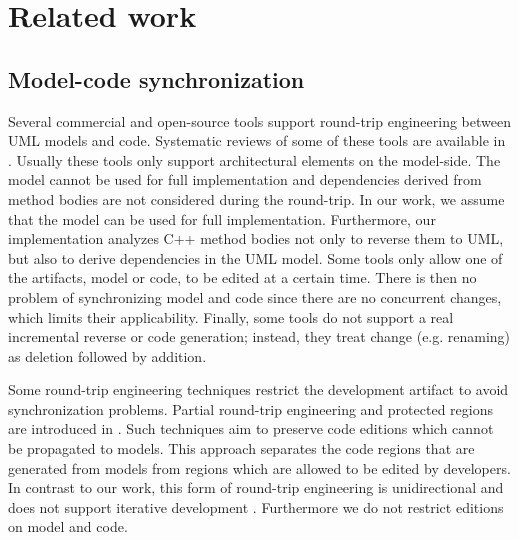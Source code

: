 \section{Related work}
\subsection{Model-code synchronization}
Several commercial and open-source tools \cite{EA, ibm_rational_2016, Magicdraw, umlgen} support round-trip engineering between UML models and code.
Systematic reviews of some of these tools are available in \cite{Cutting2015}.
Usually these tools only support architectural elements on the model-side.
The model cannot be used for full implementation and
dependencies derived from
method bodies are not considered during the round-trip. In our work, we assume that
the model can be used for full implementation. Furthermore, our implementation analyzes
C++ method bodies not only to reverse them to UML, but also to derive dependencies in the UML model.
Some tools \cite{EA} only allow
one of the artifacts, model or code, to be edited at a certain time.
There is then no problem of synchronizing model and code since there are no concurrent changes, which limits their applicability.
Finally, some tools \cite{umlgen} do not support a real incremental reverse or code generation;
instead, they treat change (e.g. renaming) as deletion followed by addition.

Some round-trip engineering techniques restrict the development artifact to avoid
synchronization problems.
Partial round-trip engineering and protected regions are introduced in \cite{czarnecki_multi-level_2006}.
Such techniques aim to preserve code editions which cannot be propagated to models.
This approach separates the code regions that are generated from models
from regions which are allowed to be edited by developers.
In contrast to our work,
this form of round-trip engineering is unidirectional and does not support iterative development \cite{Jorges2013}.
Furthermore we do not restrict editions on model and code.


